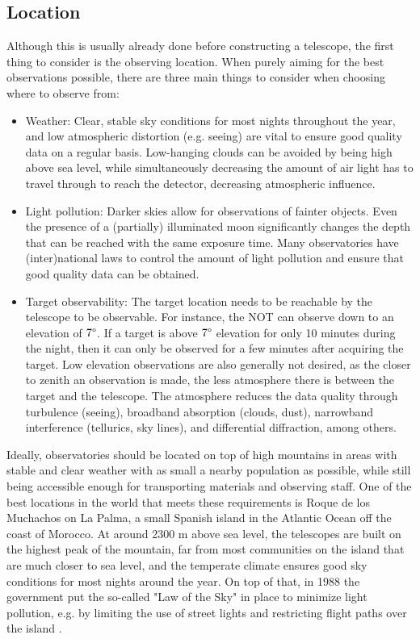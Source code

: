\documentclass[a4paper,oneside,12pt, class=Latex/Classes/PhDthesisPSnPDF, crop=false]{standalone}
\begin{document}
\subsection{Location}
Although this is usually already done before constructing a telescope, the first thing to consider is the observing location. When purely aiming for the best observations possible, there are three main things to consider when choosing where to observe from:
\begin{itemize}
    \item {Weather: Clear, stable sky conditions for most nights throughout the year, and low atmospheric distortion (e.g. seeing) are vital to ensure good quality data on a regular basis. Low-hanging clouds can be avoided by being high above sea level, while simultaneously decreasing the amount of air light has to travel through to reach the detector, decreasing atmospheric influence.}
    \item {Light pollution: Darker skies allow for observations of fainter objects. Even the presence of a (partially) illuminated moon significantly changes the depth that can be reached with the same exposure time. Many observatories have (inter)national laws to control the amount of light pollution and ensure that good quality data can be obtained.}
    \item {Target observability: The target location needs to be reachable by the telescope to be observable. For instance, the NOT can observe down to an elevation of $7\degree$. If a target is above $7\degree$ elevation for only 10 minutes during the night, then it can only be observed for a few minutes after acquiring the target. Low elevation observations are also generally not desired, as the closer to zenith an observation is made, the less atmosphere there is between the target and the telescope. The atmosphere reduces the data quality through turbulence (seeing), broadband absorption (clouds, dust), narrowband interference (tellurics, sky lines), and differential diffraction, among others.}
\end{itemize}

Ideally, observatories should be located on top of high mountains in areas with stable and clear weather with as small a nearby population as possible, while still being accessible enough for transporting materials and observing staff. One of the best locations in the world that meets these requirements is Roque de los Muchachos on La Palma, a small Spanish island in the Atlantic Ocean off the coast of Morocco. At around 2300 m above sea level, the telescopes are built on the highest peak of the mountain, far from most communities on the island that are much closer to sea level, and the temperate climate ensures good sky conditions for most nights around the year. On top of that, in 1988 the government put the so-called "Law of the Sky" in place to minimize light pollution, e.g. by limiting the use of street lights and restricting flight paths over the island \citep{LP_Sky_law}.
\end{document}
